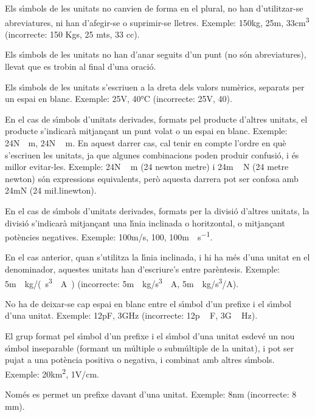 Els s\'{\i}mbols de les unitats no canvien de forma en el plural, no han
d'utilitzar-se abreviatures, ni han d'afegir-se o suprimir-se
lletres. Exemple: 150\unit{kg}, 25\unit{m},  33\unit{cm^3}
(incorrecte: 150 Kgs, 25 mts, 33 cc).

Els s\'{\i}mbols de les unitats no han d'anar seguits d'un punt (no s\'{o}n
abreviatures), llevat que es trobin al final d'una oraci\'{o}.

Els s\'{\i}mbols de les unitats s'escriuen a la dreta dels valors
num\`{e}rics, separats per un espai en blanc. Exemple: 25\unit{V},
40\unit{\celsius} (incorrecte: 25V, 40\celsius).

En el cas de s\'{\i}mbols d'unitats derivades, formats pel producte
d'altres unitats, el producte s'indicar\`{a} mitjan\c{c}ant un punt volat o
un espai en blanc. Exemple: 24\unit{N\cdot m}, 24\unit{N\,m}. En
aquest darrer cas, cal tenir en compte  l'ordre en qu\`{e} s'escriuen
les unitats, ja que algunes combinacions poden produir confusi\'{o}, i
\'{e}s millor evitar-les. Exemple: 24\unit{N\,m} (24 newton metre) i
24\unit{m\,N} (24 metre newton) s\'{o}n expressions equivalents, per\`{o}
aquesta darrera pot ser confosa amb 24\unit{mN} (24 mi{\l.l}inewton).

En el cas de s\'{\i}mbols d'unitats derivades, formats per la divisi\'{o}
d'altres unitats, la divisi\'{o} s'indicar\`{a} mitjan\c{c}ant una l\'{\i}nia
inclinada o horitzontal, o mitjan\c{c}ant pot\`{e}ncies negatives. Exemple:
100\unit{m/s}, 100\unit{}, 100\unit{m\cdot s^{-1}}.

En el cas anterior, quan s'utilitza la l\'{\i}nia inclinada, i hi ha m\'{e}s
d'una unitat en el denominador, aquestes unitats han d'escriure's
entre par\`{e}ntesis. Exemple: 5\unit{m\cdot kg/(s^3\cdot A)}
(incorrecte: 5\unit{m\cdot kg/s^3\cdot A}, 5\unit{m\cdot kg/s^3/
A}).

No ha de deixar-se cap espai en blanc entre el s\'{\i}mbol d'un prefixe i
el s\'{\i}mbol d'una unitat. Exemple: 12\unit{pF}, 3\unit{GHz}
(incorrecte: 12\unit{p\,F}, 3\unit{G\,Hz}).

El grup format pel s\'{\i}mbol d'un prefixe i el s\'{\i}mbol d'una unitat
esdev\'{e} un nou s\'{\i}mbol inseparable (formant un m\'{u}ltiple o subm\'{u}ltiple
de la unitat), i pot ser pujat a una pot\`{e}ncia positiva o negativa, i
combinat amb altres s\'{\i}mbols. Exemple: 20\unit{km^2}, 1\unit{V/cm}.

Nom\'{e}s es permet un prefixe davant d'una unitat. Exemple: 8\unit{nm}
(incorrecte: 8 m\micro m).


